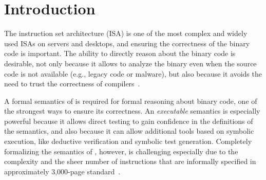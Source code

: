     \section{Introduction}
\label{sec:Intro}


The \ISA instruction set architecture (ISA) is one of the most complex and widely used ISAs on servers and desktops, 
and ensuring the correctness of the \ISA binary code is important.
%
The ability to directly reason about the binary code is desirable, not only because it allows to analyze the binary even when the source code is not available (e.g., legacy code or malware), but also because it avoids the need to trust the correctness of compilers~\cite{Thompson,WYSINWYE}.



A formal semantics of \ISA is required for formal reasoning about binary code, one of the strongest ways to ensure its correctness.
%
An \emph{executable} semantics is especially powerful because it allows direct testing to gain confidence in the definitions of the semantics, and also because it can allow additional tools based on symbolic execution, like deductive verification and symbolic test generation.
%
Completely formalizing the semantics of \ISA, however, is challenging especially due to the complexity and the sheer number of instructions that are informally specified in approximately 3,000-page standard~\cite{IntelManual}.

